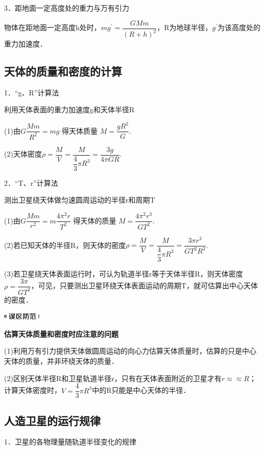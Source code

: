 \documentclass[cn,10.5pt,chinese,mac,chinesefont=founder]{elegantbook}
\begin{document}
3．距地面一定高度处的重力与万有引力

物体在距地面一定高度h处时，$m g^{\prime}=\dfrac{G M m}{(R+h)^{2}}$，R为地球半径，$g^{'}$为该高度处的重力加速度．



\subsection{天体的质量和密度的计算}

1．``g、R''计算法

利用天体表面的重力加速度g和天体半径R

(1)由$G \dfrac{M m}{R^{2}}=m g$ 得天体质量 $M=\dfrac{g R^{2}}{G}$.

(2)天体密度$\rho=\dfrac{M}{V}=\dfrac{M}{\dfrac{4}{3} \pi R^{3}}=\dfrac{3 g}{4 \pi G R}$.

2．``T、r''计算法

测出卫星绕天体做匀速圆周运动的半径r和周期T

(1)由$G \dfrac{M m}{r^{2}}=m \dfrac{4 \pi^{2} r}{T^{2}}$ 得天体的质量 $M=\dfrac{4 \pi^{2} r^{3}}{G T^{2}}$.

(2)若已知天体的半径R，则天体的密度$\rho=\dfrac{M}{V}=\dfrac{M}{\dfrac{4}{3} \pi R^{3}}=\dfrac{3 \pi r^{3}}{G T^{2} R^{3}}$.　

(3)若卫星绕天体表面运行时，可认为轨道半径r等于天体半径R，则天体密度$\rho=\dfrac{3 \pi}{G T^{2}}$，可见，只要测出卫星环绕天体表面运动的周期T，就可估算出中心天体的密度．


\begin{center}\includegraphics[width=0.71667in,height=0.13333in]{media/image34.png}

\textbf{估算天体质量和密度时应注意的问题}
\end{center}


(1)利用万有引力提供天体做圆周运动的向心力估算天体质量时，估算的只是中心天体的质量，并非环绕天体的质量．

(2)区别天体半径R和卫星轨道半径r，只有在天体表面附近的卫星才有$r\approx ≈R$；计算天体密度时，$V=\dfrac{4}{3} \pi R^{3}$中的R只能是中心天体的半径．

\newpage
\subsection{人造卫星的运行规律}

1．卫星的各物理量随轨道半径变化的规律
\end{document}
